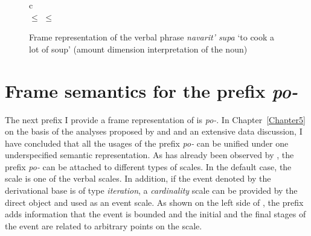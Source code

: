 \begin{figure}
\begin{tabular}{c}
\\
 $\leq$  $\leq$ 
\end{tabular}
\caption{Frame representation of the verbal phrase \textit{navarit' supa} `to cook a lot of soup' (amount dimension interpretation of the noun) \label{frame:navarit:soup:amount}}
\end{figure}


\section{Frame semantics for the prefix \textit{po-}}\label{section:frame:po}
The next prefix I provide a frame representation of is \textit{po-}. In Chapter~\ref{Chapter5} on the basis of the analyses proposed by \citet{Filip:00} and \citealt{Kagan:book} and an extensive data discussion, I have concluded that all the usages of the prefix \textit{po-} can be unified under one underspecified semantic representation. As has already been observed by \citet{Kagan:book}, the prefix \textit{po-} can be attached to different types of scales. In the default case, the scale is one of the verbal scales. In addition, if the event denoted by the derivational base is of type \textit{iteration}, a \textit{cardinality} scale can be provided by the direct object and used as an event scale. As shown on the left side of , the prefix adds information that the event is bounded and the initial and the final stages of the event are related to arbitrary points on the scale.

